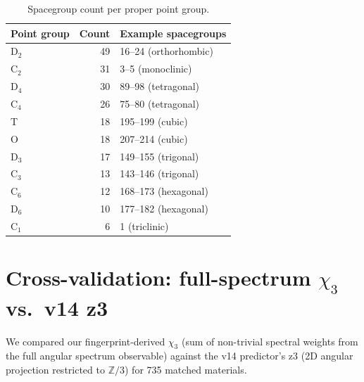 \documentclass[aps,prb,onecolumn]{revtex4-2}
\newcommand{\ZZ}{\mathbb{Z}}
\begin{document}
\begin{table}[h]
\caption{Spacegroup count per proper point group.}
\begin{ruledtabular}
\begin{tabular}{lrl}
Point group & Count & Example spacegroups \\
\midrule
D$_2$ & 49 & 16--24 (orthorhombic) \\
C$_2$ & 31 & 3--5 (monoclinic) \\
D$_4$ & 30 & 89--98 (tetragonal) \\
C$_4$ & 26 & 75--80 (tetragonal) \\
T     & 18 & 195--199 (cubic) \\
O     & 18 & 207--214 (cubic) \\
D$_3$ & 17 & 149--155 (trigonal) \\
C$_3$ & 13 & 143--146 (trigonal) \\
C$_6$ & 12 & 168--173 (hexagonal) \\
D$_6$ & 10 & 177--182 (hexagonal) \\
C$_1$ &  6 & 1 (triclinic) \\
\end{tabular}
\end{ruledtabular}
\end{table}

\section{Cross-validation: full-spectrum $\chi_3$ vs.\ v14 z3}
\label{sec:cross-validation}

We compared our fingerprint-derived $\chi_3$ (sum of non-trivial
spectral weights from the full angular spectrum observable) against
the v14 predictor's z3 (2D angular projection restricted to
$\ZZ/3$) for 735 matched materials.
\end{document}
